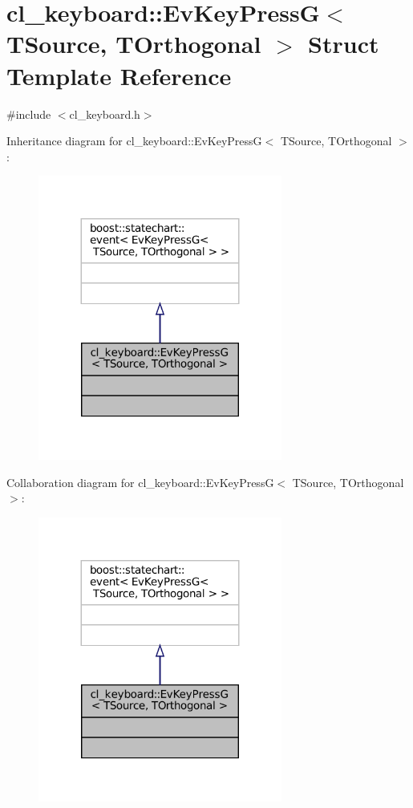 \hypertarget{structcl__keyboard_1_1EvKeyPressG}{}\section{cl\+\_\+keyboard\+:\+:Ev\+Key\+PressG$<$ T\+Source, T\+Orthogonal $>$ Struct Template Reference}
\label{structcl__keyboard_1_1EvKeyPressG}


{\ttfamily \#include $<$cl\+\_\+keyboard.\+h$>$}



Inheritance diagram for cl\+\_\+keyboard\+:\+:Ev\+Key\+PressG$<$ T\+Source, T\+Orthogonal $>$\+:
\nopagebreak
\begin{figure}[H]
\begin{center}
\leavevmode
\includegraphics[width=227pt]{structcl__keyboard_1_1EvKeyPressG__inherit__graph}
\end{center}
\end{figure}


Collaboration diagram for cl\+\_\+keyboard\+:\+:Ev\+Key\+PressG$<$ T\+Source, T\+Orthogonal $>$\+:
\nopagebreak
\begin{figure}[H]
\begin{center}
\leavevmode
\includegraphics[width=227pt]{structcl__keyboard_1_1EvKeyPressG__coll__graph}
\end{center}
\end{figure}


